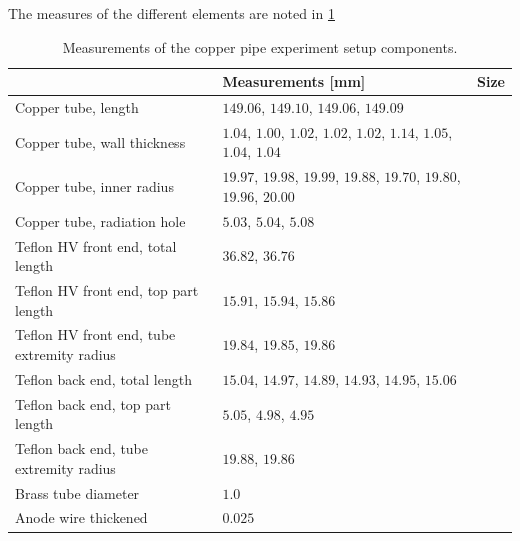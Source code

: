 The measures of the different elements are noted in \ref{Tab:coppercan_sizes}


\begin{table}[]
	\begin{tabular}{l|l|l}
		& Measurements {[}mm{]}                                                  & Size \\ \hline
		Copper tube, length                        & $149.06$, $149.10$, $149.06$, $149.09$                                 &      \\
		Copper tube, wall thickness                & $1.04$, $1.00$, $1.02$, $1.02$, $1.02$, $1.14$, $1.05$, $1.04$, $1.04$ &      \\
		Copper tube, inner radius                  & $19.97$, $19.98$, $19.99$, $19.88$, $19.70$, $19.80$, $19.96$, $20.00$ &      \\
		Copper tube, radiation hole                & $5.03$, $5.04$, $5.08$                                                 &      \\
		Teflon HV front end,  total length         & $36.82$, $36.76$                                                       &      \\
		Teflon HV front end, top part length       & $15.91$, $15.94$, $15.86$                                              &      \\
		Teflon HV front end, tube extremity radius & $19.84$, $19.85$, $19.86$                                              &      \\
		Teflon back end, total length              & $15.04$, $14.97$, $14.89$, $14.93$, $14.95$, $15.06$                   &      \\
		Teflon back end, top part length           & $5.05$, $4.98$, $4.95$                                                 &      \\
		Teflon back end, tube extremity radius     & $19.88$, $19.86$                                                       &      \\
		Brass tube diameter                        & $1.0$                                                                  &      \\
		Anode wire thickened                       & $0.025$                                                                &     
	\end{tabular}
\caption{Measurements of the copper pipe experiment setup components.}
\label{Tab:coppercan_sizes}
\end{table}
